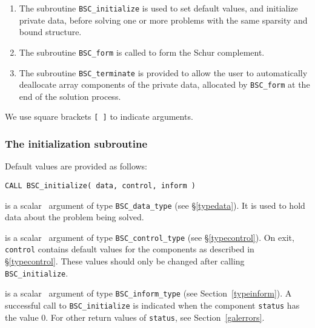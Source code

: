\documentclass{galahad}
\newcommand{\packagename}{BSC}
\begin{document}
\begin{enumerate}
\item The subroutine
      {\tt \packagename\_initialize}
      is used to set default values, and initialize private data,
      before solving one or more problems with the
      same sparsity and bound structure.
\item The subroutine
      {\tt \packagename\_form}
      is called to form the Schur complement.
\item The subroutine
      {\tt \packagename\_terminate}
      is provided to allow the user to automatically deallocate array
       components of the private data, allocated by
       {\tt \packagename\_form}
       at the end of the solution process.
\end{enumerate}
We use square brackets {\tt [ ]} to indicate \optional arguments.


\subsubsection{The initialization subroutine}\label{subinit}
 Default values are provided as follows:
\vspace*{1mm}

\hspace{8mm}
{\tt CALL \packagename\_initialize( data, control, inform )}

\vspace*{-3mm}
\begin{description}

 is a scalar \intentinout\ argument of type
{\tt \packagename\_data\_type}
(see \S\ref{typedata}). It is used to hold data about the problem being
solved.

 is a scalar \intentout\ argument of type
{\tt \packagename\_control\_type}
(see \S\ref{typecontrol}).
On exit, {\tt control} contains default values for the components as
described in \S\ref{typecontrol}.
These values should only be changed after calling
{\tt \packagename\_initialize}.

 is a scalar \intentout\ argument of type
{\tt \packagename\_inform\_type}
(see Section~\ref{typeinform}). A successful call to
{\tt \packagename\_initialize}
is indicated when the  component {\tt status} has the value 0.
For other return values of {\tt status}, see Section~\ref{galerrors}.

\end{description}
\end{document}
